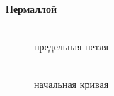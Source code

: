 \documentclass[a4paper, 12pt]{article}
\begin{document}
\begin{center}
	\textbf{Пермаллой}
\end{center}

\begin{figure}[h]
	\begin{minipage}[h]{0.5\linewidth}
		\\ предельная петля
	\end{minipage}
	\begin{minipage}[h]{0.5\linewidth}
		\\ начальная кривая
	\end{minipage}
\end{figure}
\end{document}

